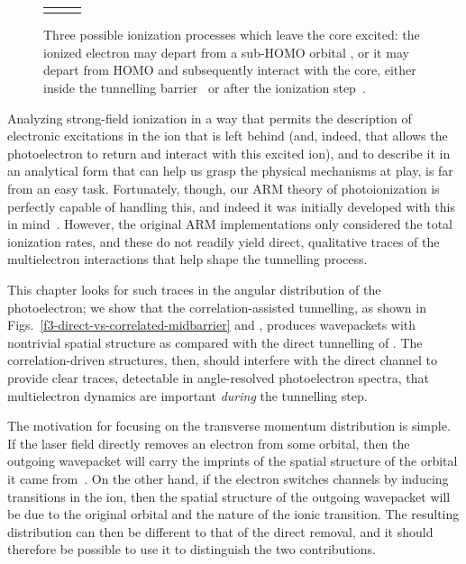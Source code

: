 \begin{figure}[htbp]
\begin{tabular}{ccc}
{  }
  \end{tabular}
  \caption[Three processes that leave the ion excited: direct ionization from a sub-HOMO orbital, or interaction-driven transitions before and after the tunnel exit]{Three possible ionization processes which leave the core excited: the ionized electron may depart from a sub-HOMO orbital \protect{}, or it may depart from HOMO and subsequently interact with the core, either inside the tunnelling barrier~\protect{} or after the ionization step~\protect{}.
  }
\label{f3-direct-vs-correlated}
\end{figure}



Analyzing strong-field ionization in a way that permits the description of electronic excitations in the ion that is left behind (and, indeed, that allows the photoelectron to return and interact with this excited ion), and to describe it in an analytical form that can help us grasp the physical mechanisms at play, is far from an easy task. Fortunately, though, our ARM theory of photoionization is perfectly capable of handling this, and indeed it was initially developed with this in mind~\cite{ ARM_initial_multielectron}. However, the original ARM implementations only considered the total ionization rates, and these do not readily yield direct, qualitative traces of the multielectron interactions that help shape the tunnelling process.

This chapter looks for such traces in the angular distribution of the photoelectron; we show that the correlation-assisted tunnelling, as shown in Figs.~\ref{f3-direct-vs-correlated-midbarrier} and , produces wavepackets with nontrivial spatial structure as compared with the direct tunnelling of . The correlation-driven structures, then, should interfere with the direct channel to provide clear traces, detectable in angle-resolved photoelectron spectra, that multielectron dynamics are important \textit{during} the tunnelling step.


The motivation for focusing on the transverse momentum distribution is simple. If the laser field directly removes an electron from some orbital, then the outgoing wavepacket  will carry the imprints of the spatial structure of the orbital it came from~\cite{meckel_LIED_2008}. On the other hand, if the electron switches channels by inducing transitions in the ion, then the spatial structure of the outgoing wavepacket will be due to the original orbital and the nature of the ionic transition. The resulting distribution can then be different to that of the direct removal, and it should therefore be possible to use it to distinguish the two contributions.


